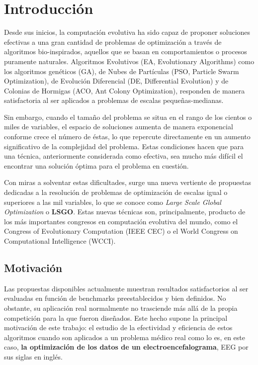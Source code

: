 \chapter{Introducción}

Desde sus inicios, la computación evolutiva ha sido capaz de proponer soluciones efectivas a una gran cantidad de problemas de optimización a través de algoritmos bio-inspirados, aquellos que se basan en comportamientos o procesos puramente naturales. Algoritmos Evolutivos (EA, Evolutionary Algorithms) como los algoritmos genéticos (GA)\cite{GA-RPO}, de Nubes de Partículas (PSO, Particle Swarm Optimization)\cite{PSO}, de Evolución Diferencial (DE, Differential Evolution)\cite{DE} y de Colonias de Hormigas (ACO, Ant Colony Optimization)\cite{ACO}, responden de manera satisfactoria al ser aplicados a problemas de escalas pequeñas-medianas.

Sin embargo, cuando el tamaño del problema se situa en el rango de los cientos o miles de variables, el espacio de soluciones aumenta de manera exponencial conforme crece el número de éstas, lo que repercute directamente en un aumento significativo de la complejidad del problema. Estas condiciones hacen que para una técnica, anteriormente considerada como efectiva, sea mucho más difícil el encontrar una solución óptima para el problema en cuestión.

Con miras a solventar estas dificultades, surge una nueva vertiente de propuestas dedicadas a la resolución de problemas de optimización de escalas igual o superiores a las mil variables, lo que se conoce como \textit{Large Scale Global Optimization} o \textbf{LSGO}\cite{ELSGOI}. Estas nuevas técnicas son, principalmente, producto de los más importantes congresos en computación evolutiva del mundo, como el Congress of Evolutionary Computation (IEEE CEC) o el World Congress on Computational Intelligence (WCCI).

\section{Motivación}

Las propuestas disponibles actualmente muestran resultados satisfactorios al ser evaluadas en función de benchmarks preestablecidos y bien definidos. No obstante, su aplicación real normalmente no trasciende más allá de la propia competición para la que fueron diseñados. Este hecho supone la principal motivación de este trabajo: el estudio de la efectividad y eficiencia de estos algoritmos cuando son aplicados a un problema médico real como lo es, en este caso, \textbf{la optimización de los datos de un electroencefalograma}, EEG por sus siglas en inglés.

